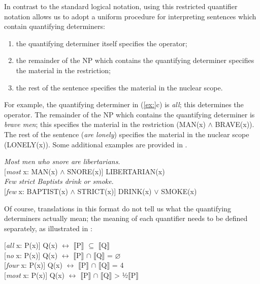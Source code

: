In contrast to the standard logical notation, using this restricted quantifier notation allows us to adopt a uniform procedure for interpreting sentences which contain quantifying determiners:


\begin{enumerate}
\item the quantifying determiner itself specifies the operator;
\item the remainder of the NP which contains the quantifying determiner specifies the material in the restriction;
\item the rest of the sentence specifies the material in the nuclear scope.
\end{enumerate}

For example, the quantifying determiner in (\ref{ex:}c) is \textit{all}; this determines the operator. The remainder of the NP which contains the quantifying determiner is \textit{brave men}; this specifies the material in the restriction (MAN(x) $\wedge$ BRAVE(x)). The rest of the sentence (\textit{are lonely}) specifies the material in the nuclear scope (LONELY(x)). Some additional examples are provided in .


\ea
\ea \textit{Most men who snore are libertarians}.\\
  {}[\textit{most} x: MAN(x) $\wedge$ SNORE(x)] LIBERTARIAN(x)\\
\ex \textit{Few strict Baptists drink or smoke}.\\
  {}[\textit{few} x: BAPTIST(x) $\wedge$ STRICT(x)] DRINK(x) $\vee$ SMOKE(x)
                       \z
\z


Of course, translations in this format do not tell us what the quantifying determiners actually mean; the meaning of each quantifier needs to be defined separately, as illustrated in :


\ea
\ea{} [\textit{all} x: P(x)] Q(x)  $\leftrightarrow $  \textsc{$\llbracket$}P$\rrbracket$  ${\subseteq}$ \textsc{$\llbracket$}Q$\rrbracket$ \\
\ex{} [\textit{no} x: P(x)] Q(x)  $\leftrightarrow $  \textsc{$\llbracket$}P$\rrbracket$  ${\cap}$ \textsc{$\llbracket$}Q$\rrbracket$  = ⌀\\
\ex{} [\textit{four} x: P(x)] Q(x)  $\leftrightarrow $  {\textbar} \textsc{$\llbracket$}P$\rrbracket$  ${\cap}$ \textsc{$\llbracket$}Q$\rrbracket$  {\textbar}  = 4\\
\ex{} [\textit{most} x: P(x)] Q(x)  $\leftrightarrow $  {\textbar} \textsc{$\llbracket$}P$\rrbracket$  ${\cap}$ \textsc{$\llbracket$}Q$\rrbracket$  {\textbar}  >  ½\textsc{{\textbar}}\textsc{$\llbracket$}P$\rrbracket$ {\textbar}
                       \z
\z



